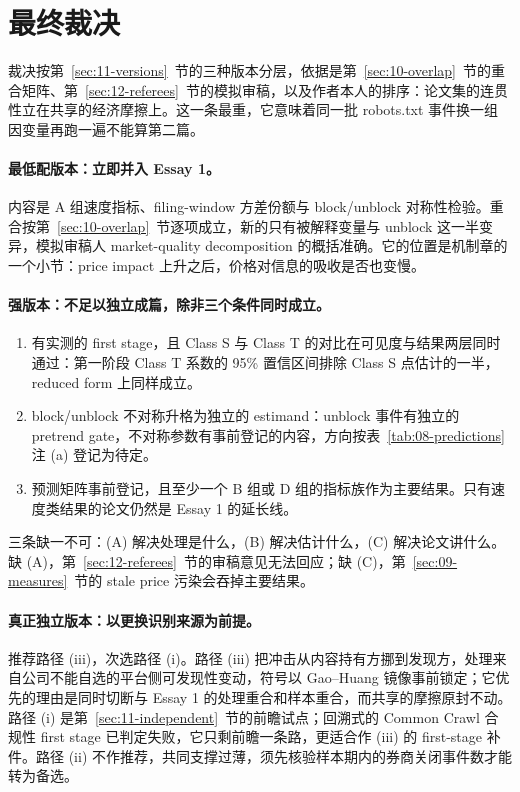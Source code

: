 \documentclass[a4paper,11pt]{ctexart}
\begin{document}
\section{最终裁决}\label{sec:13-verdict}

裁决按第~\ref{sec:11-versions}~节的三种版本分层，依据是第~\ref{sec:10-overlap}~节的重合矩阵、第~\ref{sec:12-referees}~节的模拟审稿，以及作者本人的排序：论文集的连贯性立在共享的经济摩擦上。这一条最重，它意味着同一批 robots.txt 事件换一组因变量再跑一遍不能算第二篇。

\paragraph{最低配版本：立即并入 Essay 1。}
内容是 A 组速度指标、filing-window 方差份额与 block/unblock 对称性检验。重合按第~\ref{sec:10-overlap}~节逐项成立，新的只有被解释变量与 unblock 这一半变异，模拟审稿人 market-quality decomposition 的概括准确。它的位置是机制章的一个小节：price impact 上升之后，价格对信息的吸收是否也变慢\citep{davilaparlatore2021}。

\paragraph{强版本：不足以独立成篇，除非三个条件同时成立。}
\begin{enumerate}[label=(\Alph*),leftmargin=2em]
\item 有实测的 first stage，且 Class S 与 Class T 的对比在可见度与结果两层同时通过：第一阶段 Class T 系数的 95\% 置信区间排除 Class S 点估计的一半，reduced form 上同样成立。
\item block/unblock 不对称升格为独立的 estimand：unblock 事件有独立的 pretrend gate，不对称参数有事前登记的内容，方向按表~\ref{tab:08-predictions} 注 (a) 登记为待定\citep{merton1987,chennoronhasingal2004}。
\item 预测矩阵事前登记，且至少一个 B 组或 D 组的指标族作为主要结果\citep{baiphilipponsavov2016,morckyeungyu2000,brogaardetal2022}。只有速度类结果的论文仍然是 Essay 1 的延长线。
\end{enumerate}
三条缺一不可：(A) 解决处理是什么，(B) 解决估计什么，(C) 解决论文讲什么。缺 (A)，第~\ref{sec:12-referees}~节的审稿意见无法回应；缺 (C)，第~\ref{sec:09-measures}~节的 stale price 污染会吞掉主要结果。

\paragraph{真正独立版本：以更换识别来源为前提。}
推荐路径 (iii)，次选路径 (i)。路径 (iii) 把冲击从内容持有方挪到发现方，处理来自公司不能自选的平台侧可发现性变动，符号以 Gao--Huang 镜像事前锁定\citep{gaohuang2020}；它优先的理由是同时切断与 Essay 1 的处理重合和样本重合，而共享的摩擦原封不动。路径 (i) 是第~\ref{sec:11-independent}~节的前瞻试点；回溯式的 Common Crawl 合规性 first stage 已判定失败，它只剩前瞻一条路，更适合作 (iii) 的 first-stage 补件。路径 (ii) 不作推荐，共同支撑过薄，须先核验样本期内的券商关闭事件数才能转为备选。
\end{document}
